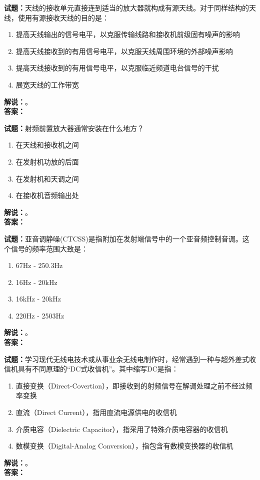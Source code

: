 \documentclass{ctexbook}
\begin{document}
\vspace{\baselineskip}

\noindent\textbf{试题：}天线的接收单元直接连到适当的放大器就构成有源天线。对于同样结构的天线，使用有源接收天线的目的是：
\begin{enumerate}[leftmargin=3em]
  \item 提高天线输出的信号电平，以克服传输线路和接收机前级固有噪声的影响
  \item 提高天线接收到的有用信号电平，以克服天线周围环境的外部噪声影响
  \item 提高天线接收到的有用信号电平，以克服临近频道电台信号的干扰
  \item 展宽天线的工作带宽
\end{enumerate}
\noindent\textbf{解说：}\textbf{}。\\\noindent\textbf{答案：}

\vspace{\baselineskip}

\noindent\textbf{试题：}射频前置放大器通常安装在什么地方？
\begin{enumerate}[leftmargin=3em]
  \item 在天线和接收机之间
  \item 在发射机功放的后面
  \item 在发射机和天调之间
  \item 在接收机音频输出处
\end{enumerate}
\noindent\textbf{解说：}\textbf{}。\\\noindent\textbf{答案：}

\vspace{\baselineskip}

\noindent\textbf{试题：}亚音调静噪(CTCSS)是指附加在发射端信号中的一个亚音频控制音调。这个信号的频率范围大致是：
\begin{enumerate}[leftmargin=3em]
  \item 67Hz - 250.3Hz
  \item 16Hz - 20\unit{\kHz}
  \item 16\unit{\kHz} - 20\unit{\kHz}
  \item 220Hz - 2503Hz
\end{enumerate}
\noindent\textbf{解说：}\textbf{}。\\\noindent\textbf{答案：}

\vspace{\baselineskip}

\noindent\textbf{试题：}学习现代无线电技术或从事业余无线电制作时，经常遇到一种与超外差式收信机具有不同原理的“DC式收信机”。其中缩写DC是指：
\begin{enumerate}[leftmargin=3em]
  \item 直接变换（Direct-Covertion），即接收到的射频信号在解调处理之前不经过频率变换
  \item 直流（Direct Current），指用直流电源供电的收信机
  \item 介质电容（Dielectric Capacitor），指采用了特殊介质电容器的收信机
  \item 数模变换（Digital-Analog Conversion），指包含有数模变换器的收信机
\end{enumerate}
\noindent\textbf{解说：}\textbf{}。\\\noindent\textbf{答案：}
\end{document}
